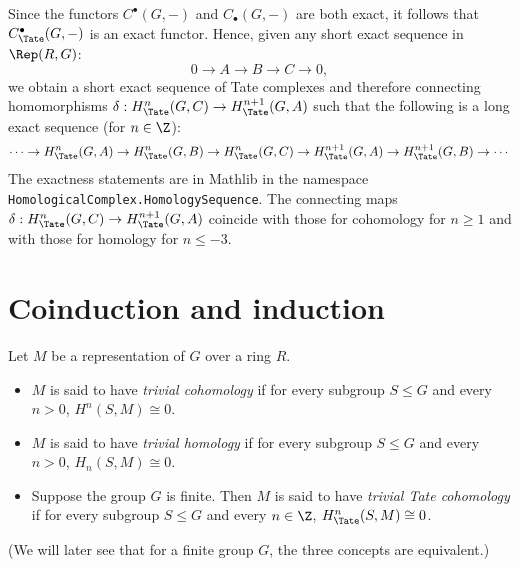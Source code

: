 \begin{definition}	\label{def:Tate long exact sequence}
	\leanok
  Since the functors $C^\bullet(G,-)$ and $C_\bullet(G,-)$ are both exact, it follows
	that $C^\bullet_{\Tate}(G,-)$ is an exact functor.
	Hence, given any short exact sequence in $\Rep(R,G)$:
	\[
		0 \to A \to B \to C \to 0,
	\]
	we obtain a short exact sequence of Tate complexes and therefore
	connecting homomorphisms $\delta : H^n_{\Tate}(G,C) \to H^{n+1}_{\Tate}(G,A)$
	such that the following is a long exact sequence (for $n \in \Z$):
	\[
		\cdots \to H^n_{\Tate}(G,A) \to H^n_{\Tate}(G,B) \to H^n_{\Tate}(G,C)
		\to H^{n+1}_{\Tate}(G,A) \to H^{n+1}_{\Tate}(G,B) \to \cdots
	\]
	The exactness statements are in Mathlib in the namespace
	\texttt{HomologicalComplex.HomologySequence}.
	The connecting maps $\delta : H^n_{\Tate}(G,C) \to H^{n+1}_{\Tate}(G,A)$
	coincide with those for cohomology for $n \ge 1$ and with those for homology for $n \le -3$.
\end{definition}





\section{Coinduction and induction}


\begin{definition} \label{def:trivial cohomology}
	\leanok
	Let $M$ be a representation of $G$ over a ring $R$.
	\begin{itemize}
		\item
		$M$ is said to have \emph{trivial cohomology} if for every subgroup $S \le G$
		and every $n > 0$, $H^n(S,M) \cong 0$.
		\item
		$M$ is said to have \emph{trivial homology} if for every subgroup $S \le G$
		and every $n > 0$, $H_n(S,M) \cong 0$.
		\item
		Suppose the group $G$ is finite. Then $M$ is said to have \emph{trivial Tate cohomology}
		if for every subgroup $S \le G$
		and every $n \in \Z$, $H^n_{\Tate}(S,M) \cong 0$.
	\end{itemize}
	(We will later see that for a finite group $G$, the three concepts are equivalent.)
\end{definition}

